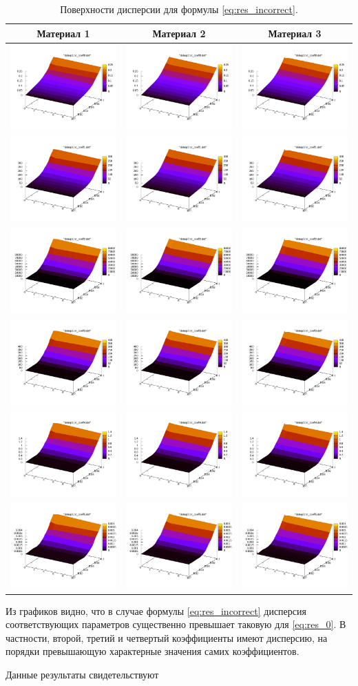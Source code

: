 \documentclass[12pt,a4paper]{article}
\begin{document}
\begin{table}[h]
  \centering
  \begin{tabular}{c c c}
	Материал 1 & Материал 2 & Материал 3 \\ \hline
	\includegraphics[scale=0.20]{figs/all/p1.txt_coeff0.dat.pdf} & \includegraphics[scale=0.20]{figs/all/p2.txt_coeff0.dat.pdf} & \includegraphics[scale=0.20]{figs/all/p3.txt_coeff0.dat.pdf} \\
	\includegraphics[scale=0.20]{figs/all/p1.txt_coeff1.dat.pdf} & \includegraphics[scale=0.20]{figs/all/p2.txt_coeff1.dat.pdf} & \includegraphics[scale=0.20]{figs/all/p3.txt_coeff1.dat.pdf} \\
	\includegraphics[scale=0.20]{figs/all/p1.txt_coeff2.dat.pdf} & \includegraphics[scale=0.20]{figs/all/p2.txt_coeff2.dat.pdf} & \includegraphics[scale=0.20]{figs/all/p3.txt_coeff2.dat.pdf} \\
	\includegraphics[scale=0.20]{figs/all/p1.txt_coeff3.dat.pdf} & \includegraphics[scale=0.20]{figs/all/p2.txt_coeff3.dat.pdf} & \includegraphics[scale=0.20]{figs/all/p3.txt_coeff3.dat.pdf} \\
	\includegraphics[scale=0.20]{figs/all/p1.txt_coeff4.dat.pdf} & \includegraphics[scale=0.20]{figs/all/p2.txt_coeff4.dat.pdf} & \includegraphics[scale=0.20]{figs/all/p3.txt_coeff4.dat.pdf} \\
	\includegraphics[scale=0.20]{figs/all/p1.txt_coeff5.dat.pdf} & \includegraphics[scale=0.20]{figs/all/p2.txt_coeff5.dat.pdf} & \includegraphics[scale=0.20]{figs/all/p3.txt_coeff5.dat.pdf}
  \end{tabular}
  \caption{Поверхности дисперсии для формулы \eqref{eq:res_incorrect}.}
  \label{tabl:res_incorrect}
\end{table}

Из графиков видно, что в случае формулы \eqref{eq:res_incorrect} дисперсия соответствующих
параметров существенно превышает таковую для \eqref{eq:res_0}. В частности, второй, третий
и четвертый коэффициенты имеют дисперсию, на порядки превышающую характерные значения самих
коэффициентов.

Данные результаты свидетельствуют 
\end{document}

